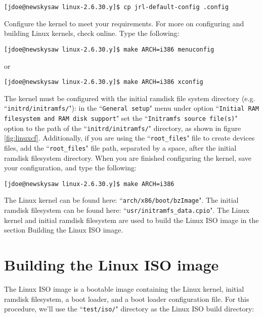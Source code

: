 \documentclass{article}[11pt]
\begin{document}
\begin{verbatim}
[jdoe@newskysaw linux-2.6.30.y]$ cp jrl-default-config .config
\end{verbatim}

\noindent
Configure the kernel to meet your requirements. For more on configuring and
building Linux kernels, check online. Type the following:

\begin{verbatim}
[jdoe@newskysaw linux-2.6.30.y]$ make ARCH=i386 menuconfig
\end{verbatim}

\noindent
or

\begin{verbatim}
[jdoe@newskysaw linux-2.6.30.y]$ make ARCH=i386 xconfig
\end{verbatim}

\noindent
The kernel must be configured with the initial ramdisk file system directory
(e.g. ``\verb|initrd/initramfs/|"): in the ``\verb|General setup|" menu under
option
``\verb|Initial RAM filesystem and RAM disk support|" set the
``\verb|Initramfs source file(s)|" option to the path of the
``\verb|initrd/initramfs/|" directory, as shown in figure \ref{fig:linuxcf}.
Additionally, if you are using the ``\verb|root_files|" file to create devices
files, add the ``\verb|root_files|" file path, separated by a space, after the
initial ramdisk filesystem directory. When you are finished configuring the
kernel, save your configuration, and type the following:

\begin{verbatim}
[jdoe@newskysaw linux-2.6.30.y]$ make ARCH=i386
\end{verbatim}

\noindent
The Linux kernel can be found here: ``\verb|arch/x86/boot/bzImage|". The initial
ramdisk filesystem can be found here: ``\verb|usr/initramfs_data.cpio|". The
Linux kernel and initial ramdisk filesystem are used to build the Linux ISO
image in the section Building the Linux ISO image.


\section{Building the Linux ISO image}

The Linux ISO image is a bootable image containing the Linux kernel, initial
ramdisk filesystem, a boot loader, and a boot loader configuration file. For
this procedure, we'll use the ``\verb|test/iso/|" directory as the Linux ISO
build directory:
\end{document}
